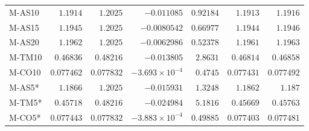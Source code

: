 \begin{longtable}{lrrrrrr}
M-AS10 & $1.1914$ & $1.2025$ & $-0.011085$ & $0.92184$ & $1.1913$ & $1.1916$ \\
M-AS15 & $1.1945$ & $1.2025$ & $-0.0080542$ & $0.66977$ & $1.1944$ & $1.1946$ \\
M-AS20 & $1.1962$ & $1.2025$ & $-0.0062986$ & $0.52378$ & $1.1961$ & $1.1963$ \\
M-TM10 & $0.46836$ & $0.48216$ & $-0.013805$ & $2.8631$ & $0.46814$ & $0.46858$ \\
M-CO10 & $0.077462$ & $0.077832$ & $-3.693\times 10^{-4}$ & $0.4745$ & $0.077431$ & $0.077492$ \\
M-AS5* & $1.1866$ & $1.2025$ & $-0.015931$ & $1.3248$ & $1.1862$ & $1.187$ \\
M-TM5* & $0.45718$ & $0.48216$ & $-0.024984$ & $5.1816$ & $0.45669$ & $0.45763$ \\
M-CO5* & $0.077443$ & $0.077832$ & $-3.883\times 10^{-4}$ & $0.49885$ & $0.077403$ & $0.077481$ \\
\hline\end{longtable}\endgroup
\begingroup\small\setlength{\tabcolsep}{4pt}
